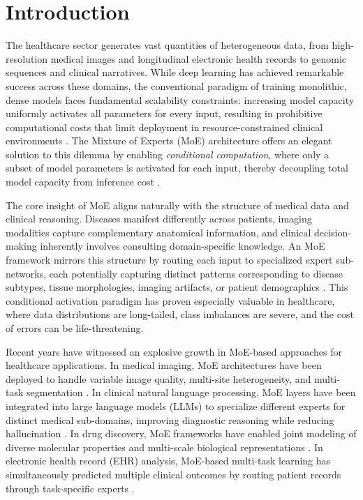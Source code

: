 
\section*{Introduction}

The healthcare sector generates vast quantities of heterogeneous data, from high-resolution medical images and longitudinal electronic health records to genomic sequences and clinical narratives. While deep learning has achieved remarkable success across these domains, the conventional paradigm of training monolithic, dense models faces fundamental scalability constraints: increasing model capacity uniformly activates all parameters for every input, resulting in prohibitive computational costs that limit deployment in resource-constrained clinical environments \cite{kaplan2020scaling}. The Mixture of Experts (MoE) architecture offers an elegant solution to this dilemma by enabling \textit{conditional computation}, where only a subset of model parameters is activated for each input, thereby decoupling total model capacity from inference cost \cite{jacobs1991adaptive, shazeer2017outrageously}.

The core insight of MoE aligns naturally with the structure of medical data and clinical reasoning. Diseases manifest differently across patients, imaging modalities capture complementary anatomical information, and clinical decision-making inherently involves consulting domain-specific knowledge. An MoE framework mirrors this structure by routing each input to specialized expert sub-networks, each potentially capturing distinct patterns corresponding to disease subtypes, tissue morphologies, imaging artifacts, or patient demographics \cite{masoudnia2014mixture}. This conditional activation paradigm has proven especially valuable in healthcare, where data distributions are long-tailed, class imbalances are severe, and the cost of errors can be life-threatening.

Recent years have witnessed an explosive growth in MoE-based approaches for healthcare applications. In medical imaging, MoE architectures have been deployed to handle variable image quality, multi-site heterogeneity, and multi-task segmentation \cite{rahman2025personalized_moe, xie2024moe_pathology}. In clinical natural language processing, MoE layers have been integrated into large language models (LLMs) to specialize different experts for distinct medical sub-domains, improving diagnostic reasoning while reducing hallucination \cite{bechar2025biocancer_moe, chen2026cor_mole}. In drug discovery, MoE frameworks have enabled joint modeling of diverse molecular properties and multi-scale biological representations \cite{acharya2025mobius}. In electronic health record (EHR) analysis, MoE-based multi-task learning has simultaneously predicted multiple clinical outcomes by routing patient records through task-specific experts \cite{rajkomar2018ehr_deep}.

